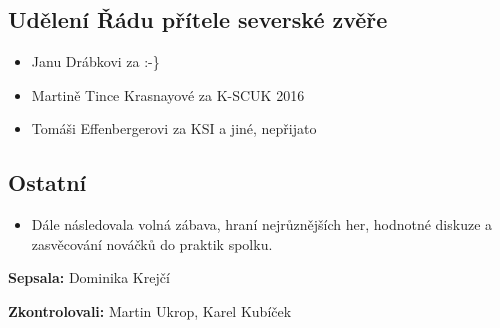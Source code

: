 \documentclass[11pt,a4paper]{article}
\begin{document}
\subsection*{Udělení Řádu přítele severské zvěře}
\begin{itemize}[itemsep=0pt]
\item Janu Drábkovi za  :-\}
\item Martině Tince Krasnayové za K-SCUK 2016
\item Tomáši Effenbergerovi za KSI a jiné, nepřijato
\end{itemize}

\subsection*{Ostatní}
\begin{itemize}[itemsep=0pt]
\item Dále následovala volná zábava, hraní nejrůznějších her, hodnotné diskuze a zasvěcování nováčků do praktik spolku.
\end{itemize}

\textbf{Sepsala:} Dominika Krejčí

\textbf{Zkontrolovali:} Martin Ukrop, Karel Kubíček
\end{document}

